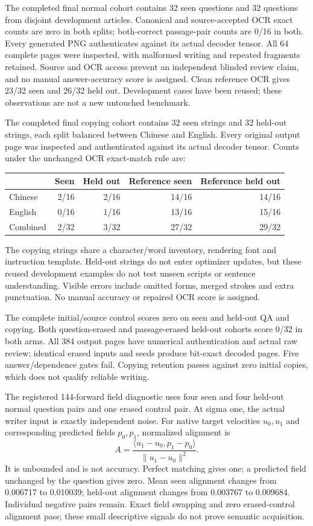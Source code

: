 \documentclass[10pt,a4paper]{article}
\begin{document}
The completed final normal cohort contains 32 seen questions and 32 questions
from disjoint development articles. Canonical and source-accepted OCR exact
counts are zero in both splits; both-correct passage-pair counts are 0/16 in
both. Every generated PNG authenticates against its actual decoder tensor.
All 64 complete pages were inspected, with malformed writing and repeated
fragments retained. Source and OCR access prevent an independent blinded
review claim, and no manual answer-accuracy score is assigned. Clean reference
OCR gives 23/32 seen and 26/32 held out. Development cases have been reused;
these observations are not a new untouched benchmark.

The completed final copying cohort contains 32 seen strings and 32 held-out
strings, each split balanced between Chinese and English. Every original
output page was inspected and authenticated against its actual decoder tensor.
Counts under the unchanged OCR exact-match rule are:
\begin{center}
\begin{tabular}{lrrrr}
 & Seen & Held out & Reference seen & Reference held out \\
\hline
Chinese & 2/16 & 2/16 & 14/16 & 14/16 \\
English & 0/16 & 1/16 & 13/16 & 15/16 \\
Combined & 2/32 & 3/32 & 27/32 & 29/32 \\
\end{tabular}
\end{center}
The copying strings share a character/word inventory, rendering font and
instruction template. Held-out strings do not enter optimizer updates, but
these reused development examples do not test unseen scripts or sentence
understanding. Visible errors include omitted forms, merged strokes and extra
punctuation. No manual accuracy or repaired OCR score is assigned.

The complete initial/source control scores zero on seen and held-out QA and
copying. Both question-erased and passage-erased held-out cohorts score 0/32
in both arms. All 384 output pages have numerical authentication and actual
raw review; identical erased inputs and seeds produce bit-exact decoded pages.
Five answer/dependence gates fail. Copying retention passes against zero
initial copies, which does not qualify reliable writing.

The registered 144-forward field diagnostic uses four seen and four held-out
normal question pairs and one erased control pair. At sigma one, the actual
writer input is exactly independent noise. For native target velocities
$u_0,u_1$ and corresponding predicted fields $p_0,p_1$, normalized alignment is
\[
A=\frac{\langle u_1-u_0,p_1-p_0\rangle}{\|u_1-u_0\|^2}.
\]
It is unbounded and is not accuracy. Perfect matching gives one; a predicted
field unchanged by the question gives zero. Mean seen alignment changes from
0.006717 to 0.010039; held-out alignment changes from 0.003767 to 0.009684. Individual
negative pairs remain. Exact field swapping and zero erased-control alignment
pass; these small descriptive signals do not prove semantic acquisition.
\end{document}
